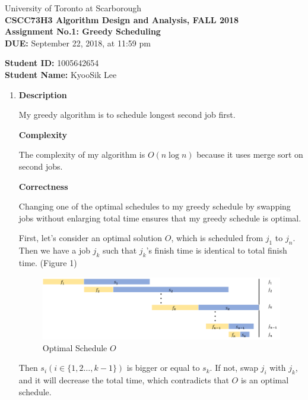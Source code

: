 \documentclass[a4paper,11pt]{article}
\begin{document}
\begin{center}
University of Toronto at Scarborough\\[0.1in]
{\bf CSCC73H3 Algorithm Design and Analysis, FALL 2018} \\[0.1in]
{\large{\bf Assignment No.1: Greedy Scheduling}}\\[0.1in]
{\bf DUE:} September 22, 2018, at 11:59 pm
\end{center}


\vspace{0.1in}
\noindent
{\bf Student ID:} 1005642654 \\[0.15in]
{\bf Student Name:} KyooSik Lee
\vspace{0.3in}

\vspace{0.3in}
\begin{enumerate}

\item {\bf Description}

My greedy algorithm is to schedule longest second job first. 

{\bf Complexity}

The complexity of my algorithm is $O(n\log{}n)$ because it uses merge sort on second jobs.

{\bf Correctness}

Changing one of the optimal schedules to my greedy schedule by swapping jobs without enlarging total time ensures that my greedy schedule is optimal.

First, let's consider an optimal solution $O$, which is scheduled from $j_1$ to $j_n$. Then we have a job $j_k$ such that $j_k$'s finish time is identical to total finish time. (Figure 1)


\begin{figure}[hbt]
	\centering
	\includegraphics[scale=0.45]{figure1.png}
	\caption{Optimal Schedule $O$}
\end{figure}

Then $s_i(i\in \{1, 2\dots,k-1\})$ is bigger or equal to $s_k$. If not, swap $j_i$ with $j_k$, and it will decrease the total time, which contradicts that $O$ is an optimal schedule.


\end{enumerate}
\end{document}
